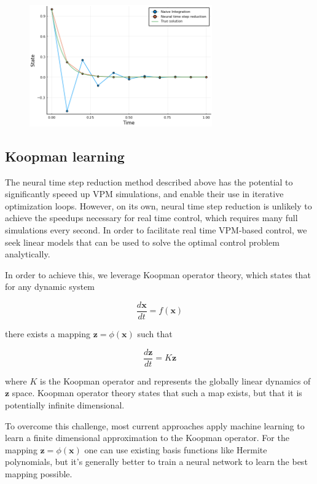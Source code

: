 \documentclass[12pt, letterpaper]{article}
\begin{document}
\begin{figure}[hbt!]
\centering
\includegraphics[width=0.7\textwidth]{figures/neural_time_step.png}
\caption{}
\label{fig:neural_time_step}
\end{figure}

\subsection{Koopman learning}

The neural time step reduction method described above has the potential to significantly speeed up VPM simulations, and enable their use in iterative optimization loops.  However, on its own, neural time step reduction is unlikely to achieve the speedups necessary for real time control, which requires many full simulations every second.  In order to facilitate real time VPM-based control, we seek linear models that can be used to solve the optimal control problem analytically. 

In order to achieve this, we leverage Koopman operator theory, which states that for any dynamic system

\begin{equation}
    \frac{d \mathbf{x}}{dt} = f(\mathbf{x})
\end{equation}

there exists a mapping $\mathbf{z} = \phi(\mathbf{x})$ such that 

\begin{equation}
    \label{eq:Koopman}
    \frac{d\mathbf{z}}{dt} = K \mathbf{z}
\end{equation}

where $K$ is the Koopman operator and represents the globally linear dynamics of $\mathbf{z}$ space. Koopman operator theory states that such a map exists, but that it is potentially infinite dimensional. 

To overcome this challenge, most current approaches apply machine learning to learn a finite dimensional approximation to the Koopman operator.  For the mapping $\mathbf{z} = \phi(\mathbf{x})$ one can use existing basis functions like Hermite polynomials, but it's generally better to train a neural network to learn the best mapping possible.
\end{document}

